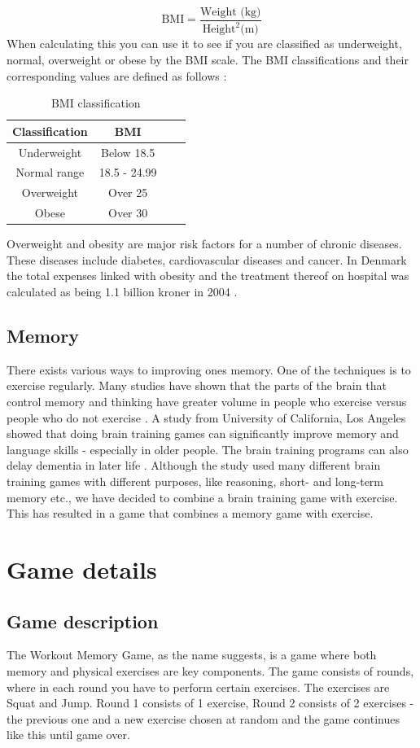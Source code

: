 \documentclass[11pt]{report}
\begin{document}
$$\text{BMI}=\frac{\text{Weight (kg)}}{\text{Height}^2 \text{(m)}}$$
When calculating this you can use it to see if you are classified as underweight, normal, overweight or obese by the BMI scale. The BMI classifications and their corresponding values are defined as follows \cite{who-bmi}:
\begin{table}[H]
\centering
\caption{BMI classification}
\begin{tabular}{| c | c | c | c}
\hline
\textbf{Classification} & \textbf{BMI}\\ \hline
Underweight & Below 18.5 \\ \hline
Normal range & 18.5 - 24.99 \\ \hline
Overweight & Over 25\\ \hline
Obese & Over 30 \\ \hline
\end{tabular}
\end{table}
Overweight and obesity are major risk factors for a number of chronic diseases. These diseases include diabetes, cardiovascular diseases and cancer. In Denmark the total expenses linked with obesity and the treatment thereof on hospital was calculated as being 1.1 billion kroner in 2004 \cite{consequences-obese}.

\section{Memory}
There exists various ways to improving ones memory. One of the techniques is to exercise regularly. Many studies have shown that the parts of the brain that control memory and thinking have greater volume in people who exercise versus people who do not exercise \cite{harvard-health}. A study from University of California, Los Angeles showed that doing brain training games can significantly improve memory and language skills - especially in older people. The brain training programs can also delay dementia in later life \cite{dailymail}. Although the study used many different brain training games with different purposes, like reasoning, short- and long-term memory etc., we have decided to combine a brain training game with exercise. This has resulted in a game that combines a memory game with exercise.

\chapter{Game details}
\section{Game description}
The Workout Memory Game, as the name suggests, is a game where both memory and physical exercises are key components. The game consists of rounds, where in each round you have to perform certain exercises. The exercises are Squat and Jump. Round 1 consists of 1 exercise, Round 2 consists of 2 exercises - the previous one and a new exercise chosen at random and the game continues like this until game over.
\end{document}
